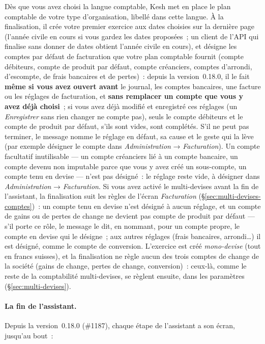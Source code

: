 \documentclass[a4paper,11pt,oneside]{article}
\begin{document}
Dès que vous avez choisi la langue comptable, Kesh met en place le plan comptable de votre type d'organisation, libellé dans cette langue. À la finalisation, il crée votre premier exercice aux dates choisies sur la dernière page (l'année civile en cours si vous gardez les dates proposées~; un client de l'API qui finalise sans donner de dates obtient l'année civile en cours), et désigne les comptes par défaut de facturation que votre plan comptable fournit (compte débiteurs, compte de produit par défaut, compte créanciers, comptes d'arrondi, d'escompte, de frais bancaires et de pertes)~: depuis la version~0.18.0, il le fait \textbf{même si vous avez ouvert avant} le journal, les comptes bancaires, une facture ou les réglages de facturation, et \textbf{sans remplacer un compte que vous y avez déjà choisi}~; si vous avez déjà modifié et enregistré ces réglages (un \emph{Enregistrer} sans rien changer ne compte pas), seuls le compte débiteurs et le compte de produit par défaut, s'ils sont vides, sont complétés. S'il ne peut pas terminer, le message nomme le réglage en défaut, sa cause et le geste qui la lève (par exemple désigner le compte dans \emph{Administration} → \emph{Facturation}). Un compte facultatif inutilisable --- un compte créanciers lié à un compte bancaire, un compte devenu non imputable parce que vous y avez créé un sous-compte, un compte tenu en devise --- n'est pas désigné~: le réglage reste vide, à désigner dans \emph{Administration} → \emph{Facturation}. Si vous avez activé le multi-devises avant la fin de l'assistant, la finalisation suit les règles de l'écran \emph{Facturation} (\S\ref{sec:multi-devises-comptes})~: un compte tenu en devise n'est désigné à aucun réglage, et un compte de gains ou de pertes de change ne devient pas compte de produit par défaut --- s'il porte ce rôle, le message le dit, en nommant, pour un compte propre, le compte en devise qui le désigne~; aux autres réglages (frais bancaires, arrondi…) il est désigné, comme le compte de conversion. L'exercice est créé \emph{mono-devise} (tout en francs suisses), et la finalisation ne règle aucun des trois comptes de change de la société (gains de change, pertes de change, conversion)~: ceux-là, comme le reste de la comptabilité multi-devises, se règlent ensuite, dans les paramètres (\S\ref{sec:multi-devises}).

\paragraph{La fin de l'assistant.} Depuis la version~0.18.0 (\#1187), chaque étape de l'assistant a son écran, jusqu'au bout~:
\end{document}
